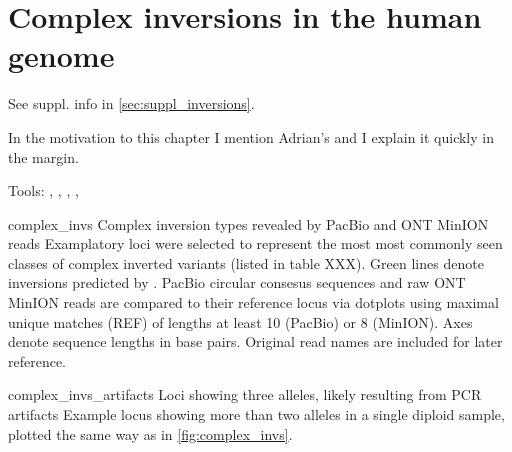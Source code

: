 \chapter{Complex inversions in the human genome}
\label{sec:inversions}

See suppl. info in \cref{sec:suppl_inversions}.

In the motivation to this chapter I mention Adrian's  and I explain it quickly in the margin.


Tools: \blasr, \last, \mummer, \bwamem, \quiver


    {complex_invs}
    {Complex inversion types revealed by PacBio and ONT MinION reads}
    {Examplatory loci were selected to represent the most most commonly seen
    classes of complex inverted variants (listed in table XXX).
    Green lines denote inversions predicted by \delly. PacBio circular
    consesus sequences and raw ONT MinION reads are compared to their reference
    locus via dotplots using maximal unique matches (REF) of
    lengths at least 10 (PacBio) or 8 (MinION). Axes denote sequence lengths in
    base pairs. Original read names are included for later reference.}

    {complex_invs_artifacts}
    {Loci showing three alleles, likely resulting from PCR artifacts}
    {Example locus showing more than two alleles in a single diploid sample,
    plotted the same way as in \cref{fig:complex_invs}.}
